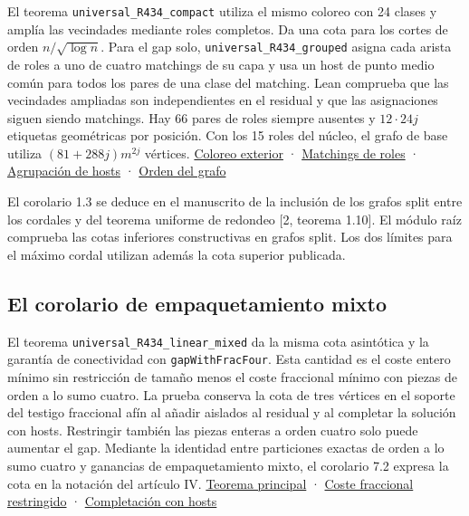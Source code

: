 \documentclass[spanish,11pt,a4paper]{article}
\begin{document}
El teorema \texttt{universal\_R434\_compact} utiliza el mismo coloreo con 24 clases y amplía las vecindades mediante roles completos. Da una cota para los cortes de orden \(n/\sqrt{\log n}\). Para el gap solo, \texttt{universal\_R434\_grouped} asigna cada arista de roles a uno de cuatro matchings de su capa y usa un host de punto medio común para todos los pares de una clase del matching. Lean comprueba que las vecindades ampliadas son independientes en el residual y que las asignaciones siguen siendo matchings. Hay 66 pares de roles siempre ausentes y \(12\cdot24j\) etiquetas geométricas por posición. Con los 15 roles del núcleo, el grafo de base utiliza \((81+288j)m^{2j}\) vértices. \href{https://github.com/jtraverso/split-clique-partition-gap/blob/ccb5444b2ecdff9de1d6221133633a25a224953d/R434/EHPSCompactExterior.lean}{Coloreo exterior} · \href{https://github.com/jtraverso/split-clique-partition-gap/blob/ccb5444b2ecdff9de1d6221133633a25a224953d/R434/RoleMatchings.lean}{Matchings de roles} · \href{https://github.com/jtraverso/split-clique-partition-gap/blob/ccb5444b2ecdff9de1d6221133633a25a224953d/R434/GroupedHosts.lean}{Agrupación de hosts} · \href{https://github.com/jtraverso/split-clique-partition-gap/blob/ccb5444b2ecdff9de1d6221133633a25a224953d/R434/GroupedGap.lean}{Orden del grafo}

El corolario 1.3 se deduce en el manuscrito de la inclusión de los grafos split entre los cordales y del teorema uniforme de redondeo {[}2, teorema 1.10{]}. El módulo raíz comprueba las cotas inferiores constructivas en grafos split. Los dos límites para el máximo cordal utilizan además la cota superior publicada.

\subsection{El corolario de empaquetamiento mixto}\label{el-corolario-de-empaquetamiento-mixto}

El teorema \texttt{universal\_R434\_linear\_mixed} da la misma cota asintótica y la garantía de conectividad con \texttt{gapWithFracFour}. Esta cantidad es el coste entero mínimo sin restricción de tamaño menos el coste fraccional mínimo con piezas de orden a lo sumo cuatro. La prueba conserva la cota de tres vértices en el soporte del testigo fraccional afín al añadir aislados al residual y al completar la solución con hosts. Restringir también las piezas enteras a orden cuatro solo puede aumentar el gap. Mediante la identidad entre particiones exactas de orden a lo sumo cuatro y ganancias de empaquetamiento mixto, el corolario 7.2 expresa la cota en la notación del artículo IV. \href{https://github.com/jtraverso/split-clique-partition-gap/blob/ccb5444b2ecdff9de1d6221133633a25a224953d/R434/PolylogGap.lean}{Teorema principal} · \href{https://github.com/jtraverso/split-clique-partition-gap/blob/ccb5444b2ecdff9de1d6221133633a25a224953d/GapExtremal/Completion.lean}{Coste fraccional restringido} · \href{https://github.com/jtraverso/split-clique-partition-gap/blob/ccb5444b2ecdff9de1d6221133633a25a224953d/GapExtremal/Bridge.lean}{Completación con hosts}
\end{document}
